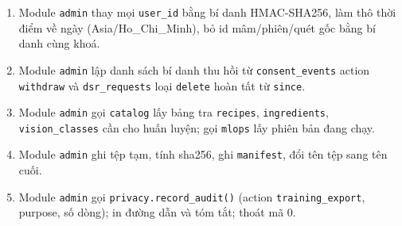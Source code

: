 \begin{enumerate}
\item Module {\small\texttt{admin}} thay mọi {\small\texttt{user\_\allowbreak{}\allowbreak{}id}} bằng bí danh HMAC-\allowbreak{}SHA256, làm thô thời điểm về ngày (Asia/\allowbreak{}Ho\_\allowbreak{}Chi\_\allowbreak{}Minh), bỏ id mâm/\allowbreak{}phiên/\allowbreak{}quét gốc bằng bí danh cùng khoá.
\item Module {\small\texttt{admin}} lập danh sách bí danh thu hồi từ {\small\texttt{consent\_\allowbreak{}\allowbreak{}events}} action {\small\texttt{withdraw}} và {\small\texttt{dsr\_\allowbreak{}\allowbreak{}requests}} loại {\small\texttt{delete}} hoàn tất từ {\small\texttt{since}}.
\item Module {\small\texttt{admin}} gọi {\small\texttt{catalog}} lấy bảng tra {\small\texttt{recipes}}, {\small\texttt{ingredients}}, {\small\texttt{vision\_\allowbreak{}\allowbreak{}classes}} cần cho huấn luyện; gọi {\small\texttt{mlops}} lấy phiên bản đang chạy.
\item Module {\small\texttt{admin}} ghi tệp tạm, tính sha256, ghi {\small\texttt{manifest}}, đổi tên tệp sang tên cuối.
\item Module {\small\texttt{admin}} gọi {\small\texttt{privacy.\allowbreak{}record\_\allowbreak{}\allowbreak{}audit()}} (action {\small\texttt{training\_\allowbreak{}\allowbreak{}export}}, purpose, số dòng); in đường dẫn và tóm tắt; thoát mã 0.
\end{enumerate}
